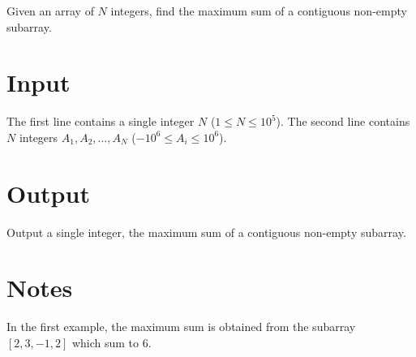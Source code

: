
Given an array of $N$ integers, find the maximum sum of a contiguous non-empty subarray.

\section*{Input}
The first line contains a single integer $N$ ($1 \le N \le 10^5$).
The second line contains $N$ integers $A_1, A_2, \dots, A_N$ ($-10^6 \le A_i \le 10^6$).

\section*{Output}
Output a single integer, the maximum sum of a contiguous non-empty subarray.

\section*{Notes}
In the first example, the maximum sum is obtained from the subarray $[2, 3, -1, 2]$ which sum to 6.
